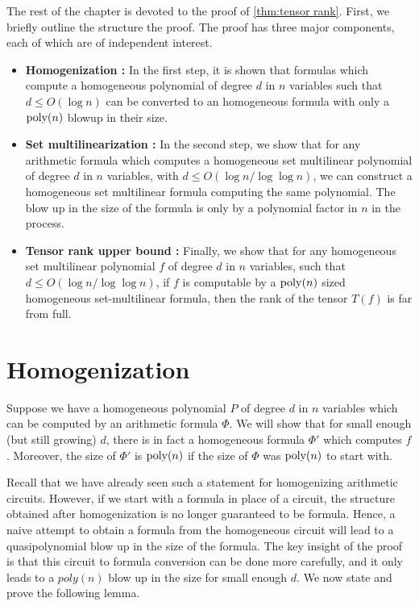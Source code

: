 The rest of the chapter is devoted to the proof of \autoref{thm:tensor rank}.
First, we briefly outline the structure the proof.
The proof has three major components, each of which are of independent interest.
\begin{itemize}
\item {\bf Homogenization :} In the first step, it is shown that
  formulas which compute a homogeneous polynomial of degree $d$ in $n$ variables such that $d \leq O(\log n)$ can be converted to an homogeneous formula with only a $\operatorname{poly}(n)$ blowup in their size.
\item {\bf Set multilinearization :} In the second step, we show that
  for any arithmetic formula which computes a homogeneous set multilinear polynomial of degree $d$ in $n$ variables, with $d \leq O(\log n/\log \log n)$, we can construct a homogeneous set multilinear formula computing the same polynomial.
The blow up in the size of the formula is only by a polynomial factor in $n$ in the process.
\item {\bf Tensor rank upper bound :} Finally, we show that for any
  homogeneous set multilinear polynomial $f$ of degree $d$ in $n$ variables, such that $d \leq O(\log n/\log \log n) $, if $f$ is computable by a $\operatorname{poly}(n)$ sized homogeneous set-multilinear formula, then the rank of the tensor $T(f)$ is far from full.
\end{itemize}


\section{Homogenization}\label{sec:homogenization}

Suppose we have a homogeneous polynomial $P$ of degree $d$ in $n$ variables which can be computed by an arithmetic formula $\Phi$.
We will show that for small enough (but still growing) $d$, there is in fact a homogeneous formula $\Phi'$ which computes $f$.
Moreover, the size of $\Phi'$ is $\operatorname{poly}(n)$ if the size of $\Phi$ was $\operatorname{poly}(n)$ to start with.

Recall that we have already seen such a statement for homogenizing arithmetic circuits.
However, if we start with a formula in place of a circuit, the structure obtained after homogenization is no longer guaranteed to be formula.
Hence, a naive attempt to obtain a formula from the homogeneous circuit will lead to a quasipolynomial blow up in the size of the formula.
The key insight of the proof is that this circuit to formula conversion can be done more carefully, and it only leads to a $poly(n)$ blow up in the size for small enough $d$.
We now state and prove the following lemma.

